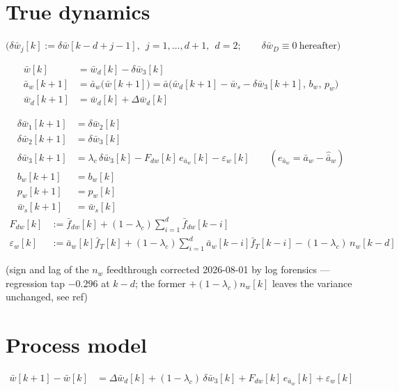 \documentclass[11pt,a4paper,fontset=none]{ctexart}
\begin{document}
\section{True dynamics}

$\bigl(\delta\bar{w}_j[k] := \delta\bar{w}[k-d+j-1],\ \ j = 1,\dots,d{+}1,
\ \ d = 2;\qquad \delta\bar{w}_D \equiv 0 \ \text{hereafter}\bigr)$

\begin{align*}
\bar{w}[k] &= \bar{w}_d[k] - \delta\bar{w}_3[k] \\
\bar{a}_w[k+1] &= \bar{a}_w\bigl(\bar{w}[k+1]\bigr)
  = \bar{a}\bigl(\bar{w}_d[k+1]-\bar{w}_s-\delta\bar{w}_3[k+1],\, b_w,\, p_w\bigr) \\
\bar{w}_d[k+1] &= \bar{w}_d[k] + \Delta\bar{w}_d[k]
\end{align*}

\begin{align*}
\delta\bar{w}_1[k+1] &= \delta\bar{w}_2[k] \\
\delta\bar{w}_2[k+1] &= \delta\bar{w}_3[k] \\
\delta\bar{w}_3[k+1] &= \lambda_c\,\delta\bar{w}_3[k]
  - F_{dw}[k]\,e_{\bar{a}_w}[k] - \varepsilon_w[k]
  \qquad (e_{\bar{a}_w} = \bar{a}_w - \hat{\bar{a}}_w) \\
b_w[k+1] &= b_w[k] \\
p_w[k+1] &= p_w[k] \\
\bar{w}_s[k+1] &= \bar{w}_s[k]
\end{align*}
\begin{align*}
F_{dw}[k] &:= \bar{f}_{dw}[k] + (1-\lambda_c)\sum_{i=1}^{d} \bar{f}_{dw}[k-i] \\
\varepsilon_w[k] &:= \bar{a}_w[k]\bar{f}_T[k]
  + (1-\lambda_c)\sum_{i=1}^{d} \bar{a}_w[k-i]\bar{f}_T[k-i]
  - (1-\lambda_c)\,n_w[k-d]
\end{align*}

(sign and lag of the $n_w$ feedthrough corrected 2026-08-01 by log
forensics --- regression tap $-0.296$ at $k{-}d$; the former
$+(1-\lambda_c)n_w[k]$ leaves the variance unchanged, see ref)

\section{Process model}

\begin{align*}
\bar{w}[k+1] - \bar{w}[k]
  &= \Delta\bar{w}_d[k] + (1-\lambda_c)\,\delta\bar{w}_3[k]
   + F_{dw}[k]\,e_{\bar{a}_w}[k] + \varepsilon_w[k]
\end{align*}
\end{document}
